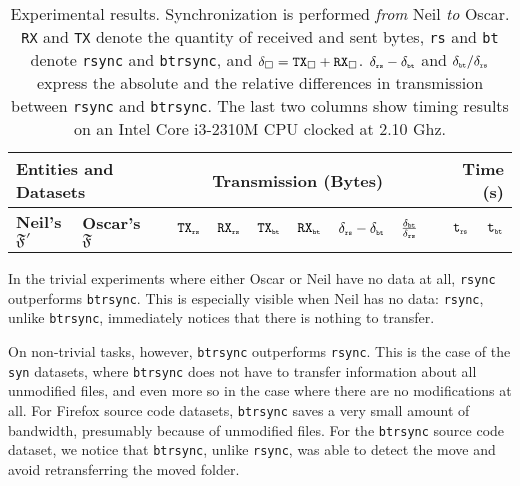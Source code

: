 \documentclass[twoside,envcountsame,runningheads]{llncs}
\newcommand{\btrsync}{\texttt{btrsync}\xspace}
\newcommand{\rsync}{\texttt{rsync}\xspace}
\begin{document}
\begin{table}[t]
  \centering
  \caption{Experimental results. Synchronization is performed \textit{from} Neil \textit{to} Oscar. {\tt RX} and {\tt TX} denote the quantity of received and sent bytes, {\tt rs} and {\tt bt} denote {\tt rsync} and {\tt btrsync}, and $\delta_{\square}=\mbox{{\tt TX}}_{\square}+\mbox{{\tt RX}}_{\square}$. $\delta_{\mbox{{\tiny {\tt rs}}}}-\delta_{\mbox{{\tiny {\tt bt}}}}$ and ${\delta_{\mbox{{\tiny {\tt bt}}}}}/{\delta_{\mbox{{\tiny {\tt rs}}}}}$ express the absolute and the relative differences in transmission between \rsync and \btrsync. The last two columns show timing results on an Intel Core i3-2310M CPU clocked at 2.10 Ghz.}
  \label{tab:results}
  \setlength{\tabcolsep}{3pt}
  \begin{tabularx}{\textwidth}{ll X r r r r r r X r r }
    \toprule
    \multicolumn{2}{l}{\bf Entities and Datasets %
}&  &  \multicolumn{6}{c}{\bf Transmission (Bytes)} &  & \multicolumn{2}{r}{\bf Time (s)} \\
    \midrule {\bf Neil's $\mathfrak{F}'$}  & {\bf Oscar's $\mathfrak{F}$}
    & & $\mbox{{\tt TX}}_{\mbox{{\tiny {\tt rs}}}}$ & $\mbox{{\tt RX}}_{\mbox{{\tiny {\tt rs}}}}$  & $\mbox{{\tt TX}}_{\mbox{{\tiny {\tt bt}}}}$  & $\mbox{{\tt RX}}_{\mbox{{\tiny {\tt bt}}}}$  & $\delta_{\mbox{{\tiny {\tt rs}}}}-\delta_{\mbox{{\tiny {\tt bt}}}}$ &
    $\frac{\delta_{\mbox{{\tiny {\tt bt}}}}}{\delta_{\mbox{{\tiny {\tt rs}}}}}$ & & $\mbox{{\tt t}}_{\mbox{{\tiny {\tt rs}}}}$ & $\mbox{{\tt t}}_{\mbox{{\tiny {\tt bt}}}}$ \\\midrule
    
    \bottomrule
  \end{tabularx}\smallskip
\end{table}


In the trivial experiments where either Oscar or Neil have no data at all, \rsync outperforms \btrsync. This is especially visible when Neil has no data: \rsync, unlike \btrsync, immediately notices that there is nothing to transfer.

On non-trivial tasks, however, \btrsync outperforms \rsync. This is the case of the {\tt syn} datasets, where \btrsync does not have to transfer
information about all unmodified files, and even more so in the case where there are no modifications at all. For Firefox source code datasets, \btrsync saves a very small amount of bandwidth, presumably because of unmodified files. For the \btrsync source code dataset, we notice that \btrsync, unlike \rsync, was able to detect the move and avoid retransferring the moved folder.
\end{document}
